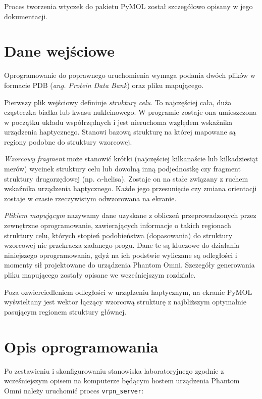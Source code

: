 \documentclass[licencjacka]{pracamgr}
\begin{document}
Proces tworzenia wtyczek do pakietu PyMOL został szczegółowo opisany w jego dokumentacji. 

\section{Dane wejściowe}
Oprogramowanie do poprawnego uruchomienia wymaga podania dwóch plików w formacie PDB (\textit{ang. Protein Data Bank}) oraz pliku mapującego. 

Pierwszy plik wejściowy definiuje \textit{strukturę celu}. To najczęściej cała, duża cząsteczka białka lub kwasu nukleinowego. W programie zostaje ona umieszczona w początku układu współrzędnych i jest nieruchoma względem wskaźnika urządzenia haptycznego. Stanowi bazową strukturę na której mapowane są regiony podobne do struktury wzorcowej.

\textit{Wzorcowy fragment} może stanowić krótki (najczęściej kilkanaście lub kilkadziesiąt merów) wycinek struktury celu lub dowolną inną podjednostkę czy fragment struktury drugorzędowej (np. $\alpha$-helisa). Zostaje on na stałe związany z ruchem wskaźnika urządzenia haptycznego. Każde jego przesunięcie czy zmiana orientacji zostaje w czasie rzeczywistym odwzorowana na ekranie. 

\textit{Plikiem mapującym} nazywamy dane uzyskane z obliczeń przeprowadzonych przez zewnętrzne oprogramowanie, zawierających informacje o takich regionach struktury celu, których stopień podobieństwa (dopasowania) do struktury wzorcowej nie przekracza zadanego progu. Dane te są kluczowe do działania niniejszego oprogramowania, gdyż na ich podstwie wyliczane są odległości i momenty sił projektowane do urządzenia Phantom Omni. Szczegóły generowania pliku mapującego zostały opisane we wcześniejszym rozdziale. 

Poza ozwierciedleniem odległości w urządzeniu haptycznym, na ekranie PyMOL wyświeltany jest wektor łączący wzorcową strukturę z najbliższym optymalnie pasującym regionem struktury głównej.

\section{Opis oprogramowania}
Po zestawieniu i skonfigurowaniu stanowiska laboratoryjnego zgodnie z wcześniejszym opisem na komputerze będącym hostem urządzenia Phantom Omni należy uruchomić proces \texttt{vrpn\_server}:
\end{document}
